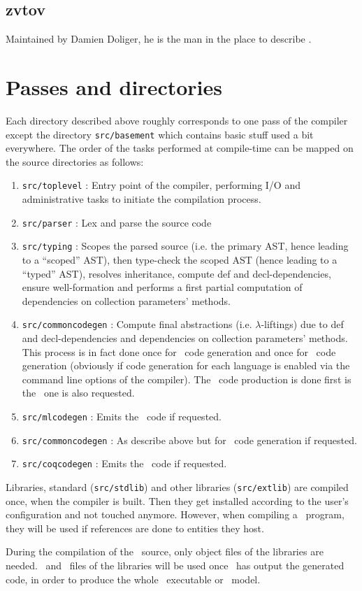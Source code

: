 \subsection{zvtov}
Maintained by Damien Doliger, he is the man in the place to describe
\smiley.


\section{Passes and directories}
Each directory described above roughly corresponds to one pass of the
compiler except the directory {\tt src/basement} which contains basic
stuff used a bit everywhere. The order of the tasks performed at
compile-time can be mapped on the source directories as follows:
\begin{enumerate}
\item {\tt src/toplevel} : Entry point of the compiler, performing I/O
  and administrative tasks to initiate the compilation process.
\item {\tt src/parser} : Lex and parse the source code
\item {\tt src/typing} : Scopes the parsed source (i.e. the primary
  AST, hence leading to a ``scoped'' AST), then type-check the scoped
  AST (hence leading to a ``typed'' AST), resolves inheritance, compute
  def and decl-dependencies, ensure well-formation and performs a first
  partial computation of dependencies on collection parameters'
  methods.
\item {\tt src/commoncodegen} : Compute final abstractions
  (i.e. $\lambda$-liftings) due to def and decl-dependencies and
  dependencies on collection parameters' methods. This process is in
  fact done once for \ocaml\ code generation and once for \coq\ code
  generation (obviously if code generation for each language is
  enabled via the command line options of the compiler). The \ocaml\
  code production is done first is the \coq\ one is also requested.
\item {\tt src/mlcodegen} : Emits the \ocaml\ code if requested.
\item {\tt src/commoncodegen} : As describe above but for \coq\ code
  generation if requested.
\item {\tt src/coqcodegen} : Emits the \coq\ code if requested.
\end{enumerate}

Libraries, standard ({\tt src/stdlib}) and other libraries
({\tt src/extlib}) are compiled once, when the compiler is built. Then
they get installed according to the user's configuration and not
touched anymore. However, when compiling a \focalize\ program, they
will be used if references are done to entities they host.

During the compilation of the \focalize\ source, only object files of
the libraries are needed. \ocaml\ and \coq\ files of the libraries
will be used once \focalizec\ has output the generated code, in order
to produce the whole \ocaml\ executable or \coq\ model.
